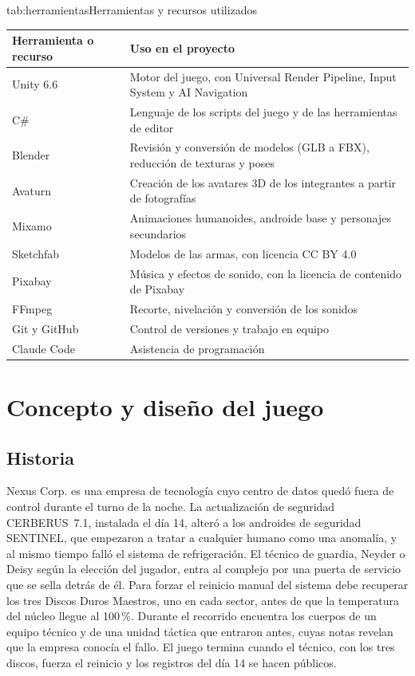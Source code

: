 \documentclass[stu,letterpaper,12pt,donotrepeattitle,floatsintext]{apa7}
\begin{document}
\begin{TablaAPA}{tab:herramientas}{Herramientas y recursos utilizados}
\begin{tabularx}{\linewidth}{P{4.4cm}L}
\toprule
Herramienta o recurso & Uso en el proyecto \\
\midrule
Unity 6.6 \parencite{unity2026} & Motor del juego, con Universal Render Pipeline, Input System y AI Navigation \\
C\# & Lenguaje de los scripts del juego y de las herramientas de editor \\
Blender \parencite{blender2026} & Revisión y conversión de modelos (GLB a FBX), reducción de texturas y poses \\
Avaturn \parencite{avaturn2026} & Creación de los avatares 3D de los integrantes a partir de fotografías \\
Mixamo \parencite{mixamo2026} & Animaciones humanoides, androide base y personajes secundarios \\
Sketchfab & Modelos de las armas, con licencia CC BY 4.0 \parencite{ccby40} \\
Pixabay & Música y efectos de sonido, con la licencia de contenido de Pixabay \parencite{pixabaylicencia} \\
FFmpeg \parencite{ffmpeg2026} & Recorte, nivelación y conversión de los sonidos \\
Git y GitHub & Control de versiones y trabajo en equipo \\
Claude Code \parencite{claudecode2026} & Asistencia de programación \\
\bottomrule
\end{tabularx}
\end{TablaAPA}

\section{Concepto y diseño del juego}

\subsection{Historia}

Nexus Corp. es una empresa de tecnología cuyo centro de datos quedó fuera de control durante el
turno de la noche. La actualización de seguridad CERBERUS~7.1, instalada el día 14, alteró a los
androides de seguridad SENTINEL, que empezaron a tratar a cualquier humano como una anomalía, y al
mismo tiempo falló el sistema de refrigeración. El técnico de guardia, Neyder o Deisy según la
elección del jugador, entra al complejo por una puerta de servicio que se sella detrás de él. Para
forzar el reinicio manual del sistema debe recuperar los tres Discos Duros Maestros, uno en cada
sector, antes de que la temperatura del núcleo llegue al 100\,\%. Durante el recorrido encuentra
los cuerpos de un equipo técnico y de una unidad táctica que entraron antes, cuyas notas revelan
que la empresa conocía el fallo. El juego termina cuando el técnico, con los tres discos, fuerza el
reinicio y los registros del día 14 se hacen públicos.
\end{document}
